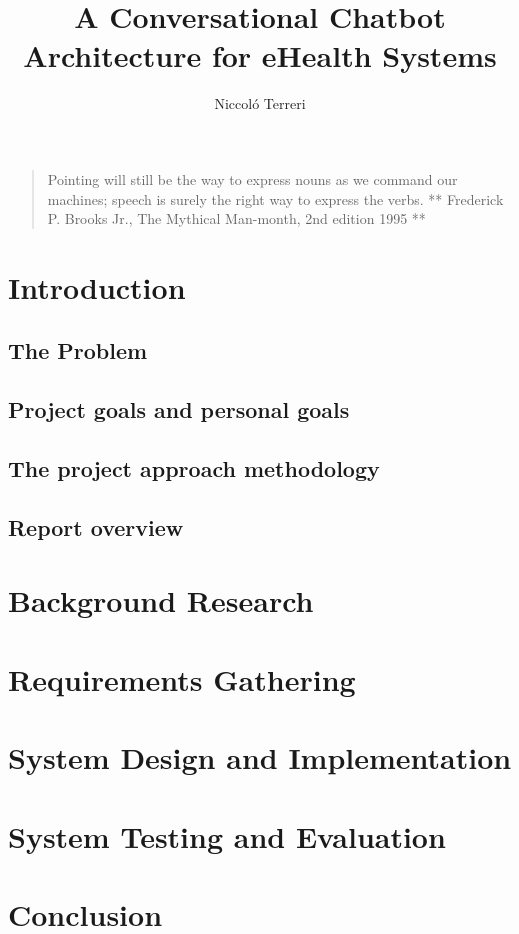 \documentclass[12pt,A4paper,twoside]{report}
\title{A Conversational Chatbot Architecture for eHealth Systems}
\author{Niccoló Terreri}
\date{}
\begin{document}
\maketitle

{
\setcounter{tocdepth}{2}
\tableofcontents
}
\begin{quote}
Pointing will still be the way to express nouns as we command our
machines; speech is surely the right way to express the verbs. **
Frederick P. Brooks Jr., The Mythical Man-month, 2nd edition 1995 **
\end{quote}

\chapter{Introduction}\label{introduction}

\section{The Problem}\label{the-problem}

\section{Project goals and personal
goals}\label{project-goals-and-personal-goals}

\section{The project approach
methodology}\label{the-project-approach-methodology}

\section{Report overview}\label{report-overview}

\chapter{Background Research}\label{background-research}

\chapter{Requirements Gathering}\label{requirements-gathering}

\chapter{System Design and
Implementation}\label{system-design-and-implementation}

\chapter{System Testing and
Evaluation}\label{system-testing-and-evaluation}

\chapter{Conclusion}\label{conclusion}
\end{document}
